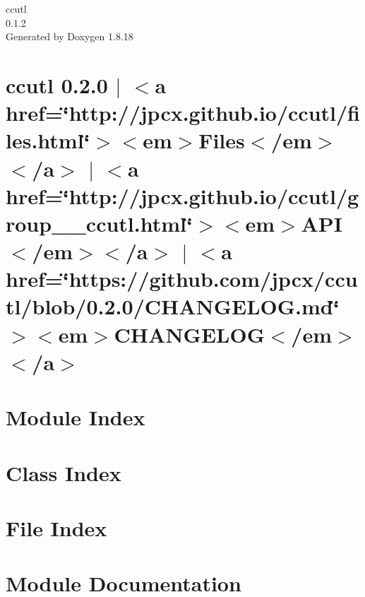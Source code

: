 \let\mypdfximage\pdfximage\def\pdfximage{\immediate\mypdfximage}\documentclass[twoside]{book}
\newcommand{\+}{\discretionary{\mbox{\scriptsize$\hookleftarrow$}}{}{}}
\newcommand{\clearemptydoublepage}{%
  \newpage{\pagestyle{empty}\cleardoublepage}%
}
\begin{document}
\hypersetup{pageanchor=false,
             bookmarksnumbered=true,
             pdfencoding=unicode
            }
\begin{titlepage}
\vspace*{7cm}
\begin{center}%
{\Large ccutl \\[1ex]\large 0.\+1.\+2 }\\
\vspace*{1cm}
{\large Generated by Doxygen 1.8.18}\\
\end{center}
\end{titlepage}
\clearemptydoublepage
{}
\tableofcontents
\clearemptydoublepage
{}
\hypersetup{pageanchor=true}

\chapter{ccutl 0.2.0 $\vert$ $<$a href=\char`\"{}http\+://jpcx.\+github.\+io/ccutl/files.\+html\char`\"{}$>$$<$em$>$Files$<$/em$>$$<$/a$>$ $\vert$ $<$a href=\char`\"{}http\+://jpcx.\+github.\+io/ccutl/group\+\_\+\+\_\+ccutl.\+html\char`\"{}$>$$<$em$>$A\+PI$<$/em$>$$<$/a$>$ $\vert$ $<$a href=\char`\"{}https\+://github.\+com/jpcx/ccutl/blob/0.\+2.\+0/\+C\+H\+A\+N\+G\+E\+L\+O\+G.\+md\char`\"{}$>$$<$em$>$C\+H\+A\+N\+G\+E\+L\+OG$<$/em$>$$<$/a$>$}
\label{index}\hypertarget{index}{}
\chapter{Module Index}

\chapter{Class Index}

\chapter{File Index}

\chapter{Module Documentation}



\end{document}
